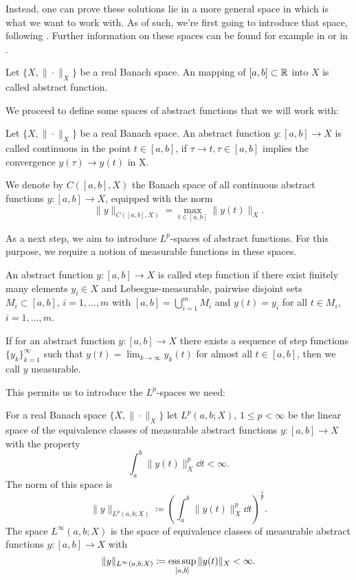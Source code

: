 \documentclass[../thesis.tex]{subfiles}
\begin{document}
Instead, one can prove these solutions lie in a more general space in which is what we want to work with. As of such, we're first going to introduce that space, following \cite[3.4.1 Abstrakte Funktionen, p.\ 113ff.]{Troeltzsch}.
Further information on these spaces can be found for example in \cite{Wloka} or in \cite{HillePhillips}.
\begin{definition}
Let $\{ X, \| \cdot \|_X \}$ be a real Banach space.
An mapping of $[a, b] \subset \mathbb{R}$ into $X$ is called abstract function.
\end{definition}
We proceed to define some spaces of abstract functions that we will work with:
\begin{definition}
Let $\{ X, \| \cdot \|_X \}$ be a real Banach space.
An abstract function $y : [a, b] \to X$ is called continuous in the point $t \in [a, b]$, if $\tau \to t, \tau \in [a, b]$ implies the convergence $y(\tau) \to y(t)$ in X.

We denote by $C([a, b], X)$ the Banach space of all continuous abstract functions $y : [a, b] \to X$, equipped with the norm
\[
	\| y \|_{C([a, b], X)} = \max_{t \in [a, b]} \| y(t) \|_X.
\]
\end{definition}
As a next step, we aim to introduce $L^p$-spaces of abstract functions.
For this purpose, we require a notion of measurable functions in these spaces.
\begin{definition}
An abstract function $y : [a, b] \to X$ is called step function if there exist finitely many elements $y_i \in X$ and Lebesgue-measurable, pairwise disjoint sets $M_i \subset [a, b]$, $i = 1, \ldots, m$ with $[a, b] = \bigcup_{i=1}^m M_i$ and $y(t) = y_i$ for all $t \in M_i$, $i = 1, \ldots, m$.

If for an abstract function $y : [a, b] \to X$ there exists a sequence of step functions $\{ y_k \}_{k=1}^\infty$ such that $y(t) = \lim_{k\to\infty} y_k(t)$ for almost all $t \in [a, b]$, then we call $y$ measurable.
\end{definition}
This permits us to introduce the $L^p$-spaces we need:
\begin{definition}
\label{def:Bochner-space}
For a real Banach space $\{ X, \| \cdot \|_X \}$ let $L^p(a, b; X)$, $1 \leq p < \infty$ be the linear space of the equivalence classes of measurable abstract functions $y : [a, b] \to X$ with the property
\[
	\int_a^b \| y(t) \|_X^p \dd t < \infty.
\]
The norm of this space is
\[
	\| y \|_{L^p(a, b; X)} \coloneqq \left( \int_a^b \| y(t) \|_X^p \dd t \right)^{\frac{1}{p}}.
\]
The space $L^\infty(a, b; X)$ is the space of equivalence classes of measurable abstract functions $y : [a, b] \to X$ with
\[
	\| y \|_{L^\infty(a, b; X)} \coloneqq \operatorname*{ess\,sup}_{[a, b]} \| y(t) \|_{X} < \infty.
\]
\end{definition}
\end{document}
